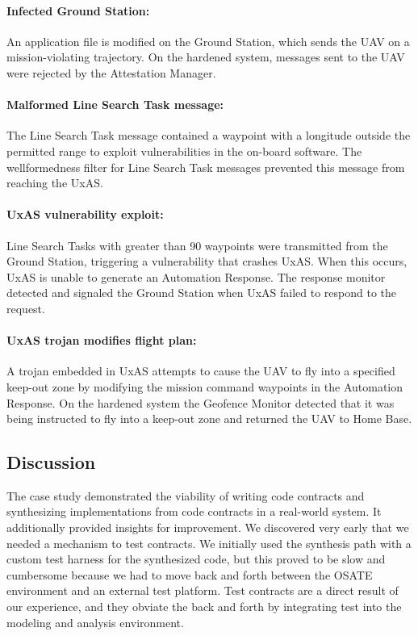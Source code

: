 \documentclass[global,twocolumn]{svjour}
\begin{document}
\paragraph{Infected Ground Station:\/} An application file is modified on the Ground Station, which sends the UAV on a mission-violating trajectory.
%
On the hardened system, messages sent to the UAV were rejected by the Attestation Manager.

\paragraph{Malformed Line Search Task message:\/}
%
The Line Search Task message contained a waypoint with a longitude outside the permitted range to exploit vulnerabilities in the on-board software.
%
The wellformedness filter for Line Search Task messages prevented this message from reaching the UxAS.

\paragraph{UxAS vulnerability exploit:\/} Line Search Tasks with greater than 90 waypoints were transmitted from the Ground Station, triggering a vulnerability that crashes UxAS.
%
When this occurs, UxAS is unable to generate an Automation Response.
%
The response monitor detected and signaled the Ground Station when UxAS failed to respond to the request.

\paragraph{UxAS trojan modifies flight plan:\/} A trojan embedded in UxAS attempts to cause the UAV to fly into a specified keep-out zone by modifying the mission command waypoints in the Automation Response.
%
On the hardened system the Geofence Monitor detected that it was being instructed to fly into a keep-out zone and returned the UAV to Home Base.


\subsection{Discussion}

The case study demonstrated the viability of writing code contracts and synthesizing implementations from code contracts in a real-world system.
%
It additionally provided insights for improvement.
%
We discovered very early that we needed a mechanism to test contracts.
%
We initially used the synthesis path with a custom test harness for the synthesized code, but this proved to be slow and cumbersome because we had to move back and forth between the OSATE environment and an external test platform.
%
Test contracts are a direct result of our experience, and they obviate the back and forth by integrating test into the modeling and analysis environment.
\end{document}
